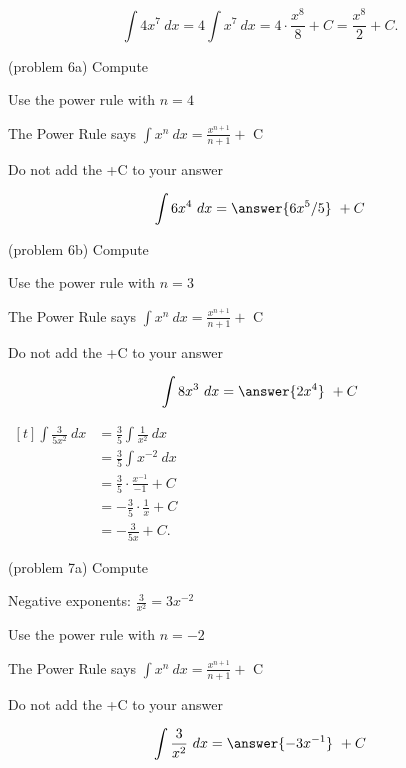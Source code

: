 \documentclass[handout]{ximera}
\begin{document}
\begin{example}[example 6]
\[
\int 4x^7 \ dx = 4 \int x^7 \ dx = 4\cdot \frac{x^8}{8} +C 
= \frac{x^8}{2} +C.
\]
\end{example}


\begin{problem}(problem 6a)
Compute 

\begin{hint}
Use the power rule with $n=4$
\end{hint}
\begin{hint}
The Power Rule says $\int x^n \ dx = \frac{x^{n+1}}{n+1} +$ C
\end{hint}
\begin{hint}
Do not add the +C to your answer
\end{hint}

\[
\int 6x^4 \ dx =
\answer{6x^5 /5} \ + C
\]
\end{problem}


\begin{problem}(problem 6b)
Compute 

\begin{hint}
Use the power rule with $n=3$
\end{hint}
\begin{hint}
The Power Rule says $\int x^n \ dx = \frac{x^{n+1}}{n+1} +$ C
\end{hint}
\begin{hint}
Do not add the +C to your answer
\end{hint}

\[
\int 8x^3 \ dx =
\answer{2x^4} \ + C
\]
\end{problem}


\begin{example}[example 7]
$\begin{aligned}[t]
\int \frac{3}{5x^2} \ dx &= \frac{3}{5} \int \frac{1}{x^2} \ dx \\[3pt]
&=\frac{3}{5} \int x^{-2} \ dx \\[3pt]
&= \frac{3}{5} \cdot \frac{x^{-1}}{-1} +C \\[5pt]
&= -\frac{3}{5} \cdot \frac{1}{x} +C \\[5pt]
&= -\frac{3}{5x} +C.
\end{aligned}$
\end{example}


\begin{problem}(problem 7a)
Compute 

\begin{hint}
Negative exponents: $\frac{3}{x^2} = 3x^{-2}$
\end{hint}
\begin{hint}
Use the power rule with $n=-2$
\end{hint}
\begin{hint}
The Power Rule says $\int x^n \ dx = \frac{x^{n+1}}{n+1} +$ C
\end{hint}
\begin{hint}
Do not add the +C to your answer
\end{hint}

\[
\int \frac{3}{x^2} \ dx =
\answer{-3x^{-1}} \ + C
\]
\end{problem}
\end{document}
